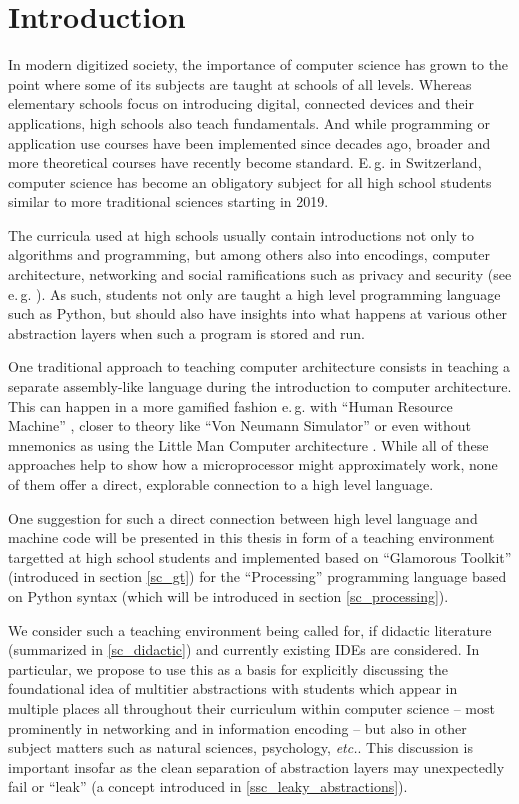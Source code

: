 
\chapter{Introduction}

In modern digitized society, the importance of computer science has grown to the point where some of its subjects are taught at schools of all levels. Whereas elementary schools focus on introducing digital, connected devices and their applications, high schools also teach fundamentals. And while programming or application use courses have been implemented since decades ago, broader and more theoretical courses have recently become standard. E.\,g. in Switzerland, computer science has become an obligatory subject for all high school students similar to more traditional sciences starting in 2019.

The curricula used at high schools usually contain introductions not only to algorithms and programming, but among others also into encodings, computer architecture, networking and social ramifications such as privacy and security (see e.\,g. \cite{Erz16}). As such, students not only are taught a high level programming language such as Python, but should also have insights into what happens at various other abstraction layers when such a program is stored and run.

One traditional approach to teaching computer architecture consists in teaching a separate assembly-like language during the introduction to computer architecture. This can happen in a more gamified fashion e.\,g. with ``Human Resource Machine'' \cite{Tom15}, closer to theory like ``Von Neumann Simulator'' \cite{Gan23} or even without mnemonics as using the Little Man Computer architecture \cite{Oin25}. While all of these approaches help to show how a microprocessor might approximately work, none of them offer a direct, explorable connection to a high level language.

One suggestion for such a direct connection between high level language and machine code will be presented in this thesis in form of a teaching environment targetted at high school students and implemented based on ``Glamorous Toolkit'' (introduced in section \ref{sc_gt}) for the ``Processing'' programming language based on Python syntax (which will be introduced in section \ref{sc_processing}).

We consider such a teaching environment being called for, if didactic literature (summarized in \ref{sc_didactic}) and currently existing \acp{IDE} are considered. In particular, we propose to use this as a basis for explicitly discussing the foundational idea of multitier abstractions with students which appear in multiple places all throughout their curriculum within computer science -- most prominently in networking and in information encoding -- but also in other subject matters such as natural sciences, psychology, \emph{etc.}. This discussion is important insofar as the clean separation of abstraction layers may unexpectedly fail or ``leak'' (a concept introduced in \ref{ssc_leaky_abstractions}).

